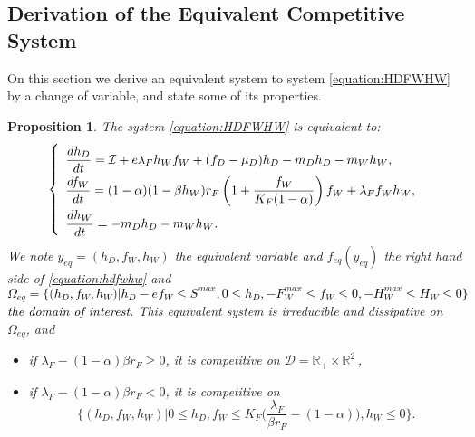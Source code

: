 \documentclass{article}
\newcommand{\lfw}{\lambda_{F}}
\newcommand{\lfw}{\lambda_{F}}
\newcommand{\cI}{\mathcal{I}}
\newcommand{\R}{\mathbb{R}}
\newcommand{\vdeux}[1]{\textcolor{black}{#1}}
\newtheorem{prop}[theorem]{Proposition}
\theoremstyle{definition}
\theoremstyle{remark}
\begin{document}
\subsection{Derivation of the Equivalent Competitive System}
On this section we derive an equivalent system to system \eqref{equation:HDFWHW} by a change of variable, and state some of its properties.  
\begin{prop} \label{prop: equivalentSystem}
The system \eqref{equation:HDFWHW} is equivalent to:
\begin{equation}
\def\arraystretch{2}
\left\{ \begin{array}{l}
\dfrac{dh_D}{dt}= \cI + e\lfw h_W f_W + (f_D - \mu_D) h_D - m_D h_D - m_W h_W, \\
\dfrac{df_W}{dt} = (1-\alpha)(1 - \beta h_W) r_F \left(1 + \dfrac{f_W}{K_F(1-\alpha)} \right) f_W + \lfw f_W h_W, \\
\dfrac{dh_W}{dt}= -m_D h_D - m_W h_W. 
\end{array} \right.
\label{equation:hdfwhw}
\end{equation}
We note $y_{eq} = (h_D, f_W, h_W)$ the equivalent variable and $f_{eq}(y_{eq})$ the right hand side of \eqref{equation:hdfwhw} and \vdeux{
$$
\Omega_{eq} = \Big\{\Big(h_D, f_W, h_W \Big)  \Big|h_D - ef_W \leq S^{max}, 0 \leq h_D,  -F_W^{max} \leq f_W \leq 0, -H_W^{max} \leq H_W \leq 0 \Big\}
$$ the domain of interest. }
This equivalent system is irreducible and dissipative on $\Omega_{eq}$, and
\begin{itemize}
\item if $\lfw - (1-\alpha)\beta r_F \geq 0$, it is competitive on $\mathcal{D} = \R_+ \times \R_-^2$,
\item if $\lfw - (1-\alpha)\beta r_F < 0$, it is competitive on $$\Big\{(h_D, f_W, h_W) | 0 \leq h_D, f_W \leq K_F\big(\dfrac{\lfw}{\beta r_F}-(1-\alpha)\big), h_W \leq 0 \Big\}.$$ 
\end{itemize}

\end{prop}
\end{document}
